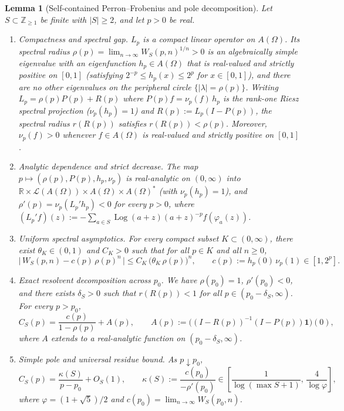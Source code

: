 \documentclass[11pt]{article}
\newtheorem{lemma}[theorem]{Lemma}
\theoremstyle{definition}
\theoremstyle{remark}
\newcommand{\R}{\mathbb{R}}
\newcommand{\Z}{\mathbb{Z}}
\begin{document}
\begin{lemma}[Self-contained Perron--Frobenius and pole decomposition]\label{lem:pole}
Let $S\subset\Z_{\ge1}$ be finite with $|S|\ge2$, and let $p>0$ be real.
\begin{enumerate}[label=\textup{(\alph*)},leftmargin=2.2em]
\item \emph{Compactness and spectral gap.} $L_p$ is a compact linear operator
on $A(\Omega)$. Its spectral radius $\rho(p)=\lim_{n\to\infty}W_S(p,n)^{1/n}>0$
is an algebraically simple eigenvalue with an eigenfunction $h_p\in A(\Omega)$
that is real-valued and strictly positive on $[0,1]$ (satisfying
$2^{-p}\le h_p(x)\le 2^p$ for $x\in[0,1]$), and there are no other eigenvalues
on the peripheral circle $\{|\lambda|=\rho(p)\}$. Writing
$L_p=\rho(p)P(p)+R(p)$ where $P(p)f=\nu_p(f)\,h_p$ is the rank-one Riesz
spectral projection ($\nu_p(h_p)=1$) and $R(p):=L_p(I-P(p))$, the spectral
radius $r(R(p))$ satisfies $r(R(p))<\rho(p)$. Moreover, $\nu_p(f)>0$ whenever
$f\in A(\Omega)$ is real-valued and strictly positive on $[0,1]$.
\item \emph{Analytic dependence and strict decrease.} The map
$p\mapsto(\rho(p),P(p),h_p,\nu_p)$ is real-analytic on $(0,\infty)$ into
$\R\times\mathcal L(A(\Omega))\times A(\Omega)\times A(\Omega)^*$ (with
$\nu_p(h_p)=1$), and $\rho'(p)=\nu_p(L_p'h_p)<0$ for every $p>0$, where
$(L_p'f)(z):=-\sum_{a\in S}\operatorname{Log}(a+z)(a+z)^{-p}f(\varphi_a(z))$.
\item \emph{Uniform spectral asymptotics.} For every compact subset
$K\subset(0,\infty)$, there exist $\theta_K\in(0,1)$ and $C_K>0$ such that
for all $p\in K$ and all $n\ge0$,
\begin{equation}\label{eq:W-asym-fixed}
\bigl|\,W_S(p,n)-c(p)\,\rho(p)^n\,\bigr|\le C_K\,\bigl(\theta_K\,\rho(p)\bigr)^n,
\qquad c(p):=h_p(0)\,\nu_p(1)\in[1,2^p].
\end{equation}
\item \emph{Exact resolvent decomposition across $p_0$.} We have $\rho(p_0)=1$,
$\rho'(p_0)<0$, and there exists $\delta_S>0$ such that $r(R(p))<1$ for all
$p\in(p_0-\delta_S,\infty)$. For every $p>p_0$,
\begin{equation}\label{eq:C-decomp-fixed}
C_S(p)=\frac{c(p)}{1-\rho(p)}+A(p),
\qquad
A(p):=\bigl((I-R(p))^{-1}(I-P(p))\mathbf 1\bigr)(0),
\end{equation}
where $A$ extends to a real-analytic function on $(p_0-\delta_S,\infty)$.
\item \emph{Simple pole and universal residue bound.} As $p\downarrow p_0$,
\begin{equation}\label{eq:pole-fixed}
C_S(p)=\frac{\kappa(S)}{p-p_0}+O_S(1),
\qquad
\kappa(S):=\frac{c(p_0)}{-\rho'(p_0)}\in\left[\frac{1}{\log(\max S+1)},\,\frac{4}{\log\varphi}\right],
\end{equation}
where $\varphi=(1+\sqrt5)/2$ and $c(p_0)=\lim_{n\to\infty}W_S(p_0,n)$.
\end{enumerate}
\end{lemma}
\end{document}
